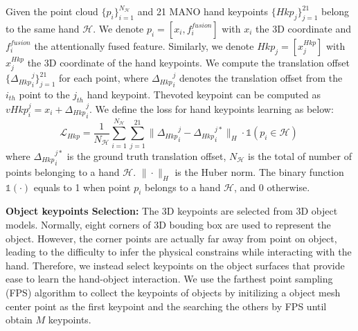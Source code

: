 Given the point cloud $\{ p_i \}^{N_{\mathcal{H}}}_{i=1}$ and 21 MANO hand keypoints $\{ Hkp_j \}^{21}_{j=1}$ belong to the same hand $\mathcal{H}$. We denote $p_i = [x_i, f^{fusion}_i]$ with $x_i$ the 3D coordinate and $f^{fusion}_i$ the attentionally fused feature. Similarly, we denote $Hkp_j = [x^{Hkp}_j]$ with $x^{Hkp}_j$ the 3D coordinate of the hand keypoints. We compute the translation offset $\{ {\Delta_{Hkp}}^j_i \}^{21}_{j=1}$ for each point, where ${\Delta_{Hkp}}^j_i$ denotes the translation offset from the $i_{th}$ point to the $j_{th}$ hand keypoint. Thevoted keypoint can be computed as $vHkp^j_i = x_i + {\Delta_{Hkp}}^j_i$. We define the loss for hand keypoints learning as below:
\begin{equation}
	\mathcal{L}_{Hkp} = \frac{1}{N_{\mathcal{H}}} \sum_{i=1}^{N_{\mathcal{H}}} \sum_{j=1}^{21} \|{\Delta_{Hkp}}^j_i - {\Delta_{Hkp}}^{j*}_i \|_H \cdot \mathds{1}(p_i \in \mathcal{H}) \
	\label{eq:loss_handjoints}
\end{equation}
where ${\Delta_{Hkp}}^{j*}_i$ is the ground truth translation offset, $N_{\mathcal{H}}$ is the total of number of points belonging to a hand $\mathcal{H}$. $\| \cdot \|_H$ is the Huber norm. The binary function $\mathds{1}(\cdot)$ equals to 1 when point $p_i$ belongs to a hand $\mathcal{H}$, and 0 otherwise.

\textbf{Object keypoints Selection:} The 3D keypoints are selected from 3D object models. Normally, eight corners of 3D bouding box are used to represent the object. However, the corner points are actually far away from point on object, leading to the difficulty to infer the physical constrains while interacting with the hand. Therefore, we instead select keypoints on the object surfaces that provide ease to learn the hand-object interaction. We use the farthest point sampling (FPS) algorithm to collect the keypoints of objects by initilizing a object mesh center point as the first keypoint and the searching the others by FPS until obtain $M$ keypoints. 

